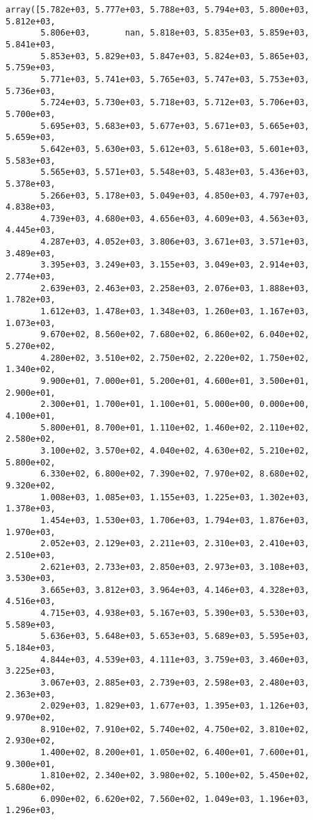 \documentclass[11pt]{article}
\begin{document}
    \begin{verbatim}
array([5.782e+03, 5.777e+03, 5.788e+03, 5.794e+03, 5.800e+03, 5.812e+03,
       5.806e+03,       nan, 5.818e+03, 5.835e+03, 5.859e+03, 5.841e+03,
       5.853e+03, 5.829e+03, 5.847e+03, 5.824e+03, 5.865e+03, 5.759e+03,
       5.771e+03, 5.741e+03, 5.765e+03, 5.747e+03, 5.753e+03, 5.736e+03,
       5.724e+03, 5.730e+03, 5.718e+03, 5.712e+03, 5.706e+03, 5.700e+03,
       5.695e+03, 5.683e+03, 5.677e+03, 5.671e+03, 5.665e+03, 5.659e+03,
       5.642e+03, 5.630e+03, 5.612e+03, 5.618e+03, 5.601e+03, 5.583e+03,
       5.565e+03, 5.571e+03, 5.548e+03, 5.483e+03, 5.436e+03, 5.378e+03,
       5.266e+03, 5.178e+03, 5.049e+03, 4.850e+03, 4.797e+03, 4.838e+03,
       4.739e+03, 4.680e+03, 4.656e+03, 4.609e+03, 4.563e+03, 4.445e+03,
       4.287e+03, 4.052e+03, 3.806e+03, 3.671e+03, 3.571e+03, 3.489e+03,
       3.395e+03, 3.249e+03, 3.155e+03, 3.049e+03, 2.914e+03, 2.774e+03,
       2.639e+03, 2.463e+03, 2.258e+03, 2.076e+03, 1.888e+03, 1.782e+03,
       1.612e+03, 1.478e+03, 1.348e+03, 1.260e+03, 1.167e+03, 1.073e+03,
       9.670e+02, 8.560e+02, 7.680e+02, 6.860e+02, 6.040e+02, 5.270e+02,
       4.280e+02, 3.510e+02, 2.750e+02, 2.220e+02, 1.750e+02, 1.340e+02,
       9.900e+01, 7.000e+01, 5.200e+01, 4.600e+01, 3.500e+01, 2.900e+01,
       2.300e+01, 1.700e+01, 1.100e+01, 5.000e+00, 0.000e+00, 4.100e+01,
       5.800e+01, 8.700e+01, 1.110e+02, 1.460e+02, 2.110e+02, 2.580e+02,
       3.100e+02, 3.570e+02, 4.040e+02, 4.630e+02, 5.210e+02, 5.800e+02,
       6.330e+02, 6.800e+02, 7.390e+02, 7.970e+02, 8.680e+02, 9.320e+02,
       1.008e+03, 1.085e+03, 1.155e+03, 1.225e+03, 1.302e+03, 1.378e+03,
       1.454e+03, 1.530e+03, 1.706e+03, 1.794e+03, 1.876e+03, 1.970e+03,
       2.052e+03, 2.129e+03, 2.211e+03, 2.310e+03, 2.410e+03, 2.510e+03,
       2.621e+03, 2.733e+03, 2.850e+03, 2.973e+03, 3.108e+03, 3.530e+03,
       3.665e+03, 3.812e+03, 3.964e+03, 4.146e+03, 4.328e+03, 4.516e+03,
       4.715e+03, 4.938e+03, 5.167e+03, 5.390e+03, 5.530e+03, 5.589e+03,
       5.636e+03, 5.648e+03, 5.653e+03, 5.689e+03, 5.595e+03, 5.184e+03,
       4.844e+03, 4.539e+03, 4.111e+03, 3.759e+03, 3.460e+03, 3.225e+03,
       3.067e+03, 2.885e+03, 2.739e+03, 2.598e+03, 2.480e+03, 2.363e+03,
       2.029e+03, 1.829e+03, 1.677e+03, 1.395e+03, 1.126e+03, 9.970e+02,
       8.910e+02, 7.910e+02, 5.740e+02, 4.750e+02, 3.810e+02, 2.930e+02,
       1.400e+02, 8.200e+01, 1.050e+02, 6.400e+01, 7.600e+01, 9.300e+01,
       1.810e+02, 2.340e+02, 3.980e+02, 5.100e+02, 5.450e+02, 5.680e+02,
       6.090e+02, 6.620e+02, 7.560e+02, 1.049e+03, 1.196e+03, 1.296e+03,

\end{verbatim}
\end{document}
